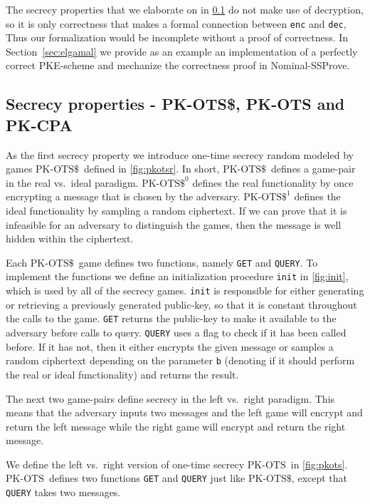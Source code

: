 \documentclass[a4paper,USenglish,cleveref, autoref]{lipics-v2021}
\newcommand{\M}[1]{\texttt{#1}}
\newcommand{\OTS}{\ensuremath{\mathrm{PK\text{-}OTS}}}
\newcommand{\OTSR}{\ensuremath{\mathrm{PK\text{-}OTS\$}}}
\newcommand{\NSSP}{Nominal-SSProve\xspace}
\begin{document}
The secrecy properties that we elaborate on in \cref{sec:secrecy} do not make use of decryption,
so it is only correctness that makes a formal connection between \M{enc} and \M{dec}, Thus our formalization
would be incomplete without a proof of correctness.
In Section~\ref{sec:elgamal} we provide as an example an implementation of a perfectly correct PKE-scheme and mechanize the correctness proof in \NSSP.
 


\subsection{Secrecy properties - PK-OTS\$, PK-OTS and PK-CPA}\label{sec:secrecy}

As the first secrecy property we introduce one-time secrecy random modeled by games
\OTSR\ defined in \cref{fig:pkotsr}.
In short, \OTSR\ defines a game-pair in the real vs.\ ideal paradigm.
$\OTSR^0$ defines the real functionality by once encrypting a message that is chosen by the adversary.
$\OTSR^1$ defines the ideal functionality by sampling a random ciphertext.
If we can prove that it is infeasible for an adversary to distinguish the games, then the message
is well hidden within the ciphertext.

Each \OTSR\ game defines two functions, namely \M{GET} and \M{QUERY}.
To implement the functions we define an initialization procedure \M{init} in \cref{fig:init},
which is used by all of the secrecy games. \M{init} is responsible for either generating or retrieving
a previously generated public-key, so that it is constant throughout the calls to the game.
\M{GET} returns the public-key to make it available to the adversary before calls to query.
\M{QUERY} uses a flag to check if it has been called before. If it has not, then it either encrypts
the given message or samples a random ciphertext depending on the parameter \M{b} (denoting if it should perform the real or ideal functionality) and returns the result.

The next two game-pairs define secrecy in the left vs.\ right paradigm.
This means that the adversary inputs two
messages and the left game will encrypt and return the left message while the right game will encrypt and return the right message.

We define the left vs.\ right version of one-time secrecy \OTS\ in \cref{fig:pkots}.
\OTS\ defines two functions \M{GET} and \M{QUERY} just like \OTSR, except that \M{QUERY} takes two messages.
\end{document}
